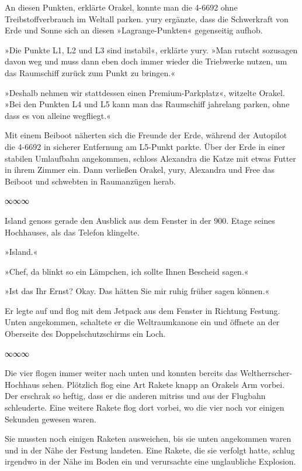 An diesen Punkten, erklärte Orakel, konnte man die 4-6692 ohne Treibstoffverbrauch im Weltall parken. yury ergänzte, dass die Schwerkraft von Erde und Sonne sich an diesen »Lagrange-Punkten« gegenseitig aufhob.

»Die Punkte L1, L2 und L3 sind instabil«, erklärte yury. »Man rutscht sozusagen davon weg und muss dann eben doch immer wieder die Triebwerke nutzen, um das Raumschiff zurück zum Punkt zu bringen.«

»Deshalb nehmen wir stattdessen einen Premium-Parkplatz«, witzelte Orakel. »Bei den Punkten L4 und L5 kann man das Raumschiff jahrelang parken, ohne dass es von alleine wegfliegt.«

Mit einem Beiboot näherten sich die Freunde der Erde, während der Autopilot die 4-6692 in sicherer Entfernung am L5-Punkt parkte. Über der Erde in einer stabilen Umlaufbahn angekommen, schloss Alexandra die Katze mit etwas Futter in ihrem Zimmer ein. Dann verließen Orakel, yury, Alexandra und Free das Beiboot und schwebten in Raumanzügen herab.

\begin{center}
    ∞∞∞
\end{center}

Island genoss gerade den Ausblick aus dem Fenster in der 900. Etage seines Hochhauses, als das Telefon klingelte.

»Island.«

»Chef, da blinkt so ein Lämpchen, ich sollte Ihnen Bescheid sagen.«

»Ist das Ihr Ernst? Okay. Das hätten Sie mir ruhig früher sagen können.«

Er legte auf und flog mit dem Jetpack aus dem Fenster in Richtung Festung. Unten angekommen, schaltete er die Weltraumkanone ein und öffnete an der Oberseite des Doppelschutzschirms ein Loch.

\begin{center}
    ∞∞∞
\end{center}

Die vier flogen immer weiter nach unten und konnten bereits das Weltherrscher-Hochhaus sehen. Plötzlich flog eine Art Rakete knapp an Orakels Arm vorbei. Der erschrak so heftig, dass er die anderen mitriss und aus der Flugbahn schleuderte. Eine weitere Rakete flog dort vorbei, wo die vier noch vor einigen Sekunden gewesen waren.

Sie mussten noch einigen Raketen ausweichen, bis sie unten angekommen waren und in der Nähe der Festung landeten. Eine Rakete, die sie verfolgt hatte, schlug irgendwo in der Nähe im Boden ein und verursachte eine unglaubliche Explosion.

